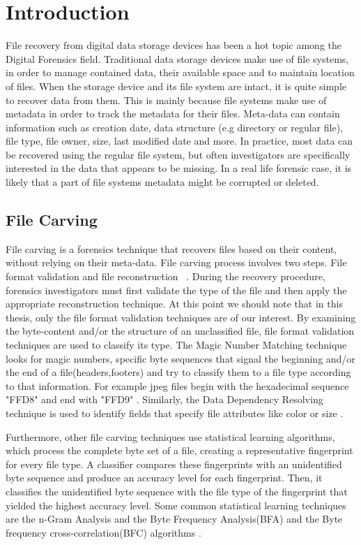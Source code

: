 \chapter{Introduction}
File recovery from digital data storage devices has been a hot topic among
the Digital Forensics field. Traditional data storage devices make use of
file systems, in order to manage contained data, their available space and to
maintain location of files. When the storage device and its file system are
intact, it is quite simple to recover data from them. This is mainly because
file systems make use of metadata in order to track the metadata for their
files. Meta-data can contain information such as creation date, data structure (e.g directory or regular file), file type, file owner, size, last modified
date and more. In practice, most data can be recovered using the regular file system, but often investigators are specifically interested in the data that appears to be missing. In a real life forensic case, it is likely that a part of file systems metadata might be corrupted or deleted. 

\section{File Carving}
File carving is a forensics technique that recovers files based on their content,
without relying on their meta-data. File carving process involves two steps.
File format validation and file reconstruction ~\cite{Aronson}. During the recovery procedure,
forensics investigators must first validate the type of the file and then apply the appropriate
reconstruction technique. At this point we should note that in this thesis, only the file format validation techniques are
of our interest.
By examining the byte-content and/or the structure of
an unclassified file, file format validation techniques are used to classify its type. The Magic Number Matching technique~\cite{Scalpel} looks for magic numbers, specific byte sequences that signal the beginning and/or the end of a file(headers,footers) and try to classify them to a file type according to that information. For example jpeg files begin with the hexadecimal sequence "FFD8" and end with "FFD9" \cite{Pal}.
Similarly, the Data Dependency Resolving technique is used to identify fields that specify file attributes like color or size \cite{Aronson}.
 
Furthermore, other file carving techniques use statistical learning algorithms, which process the complete byte set of a file, creating a representative fingerprint for
every file type. A classifier compares these fingerprints with an unidentified byte sequence and produce an accuracy level for each fingerprint. Then, it classifies the unidentified byte sequence with the file type of the fingerprint that yielded the highest accuracy level. Some common statistical learning techniques are the n-Gram Analysis \cite{ngram} and the Byte Frequency Analysis(BFA)  and the Byte frequency cross-correlation(BFC) algorithms \cite{McDaniel}.

